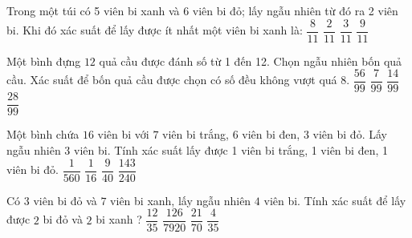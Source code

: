 \begin{ex}
Trong một túi có 5 viên bi xanh và 6 viên bi đỏ; lấy ngẫu nhiên từ đó ra 2 viên bi. Khi đó xác suất để lấy được ít nhất một viên bi xanh là:
\choice
{$\dfrac{8}{11}$}
{$\dfrac{2}{11}$}
{\True $\dfrac{3}{11}$}
{$\dfrac{9}{11}$}
\end{ex}
\begin{ex}
Một bình đựng $12$ quả cầu được đánh số từ 1 đến 12. Chọn ngẫu nhiên bốn quả cầu. Xác suất để bốn quả cầu được chọn có số đều không vượt quá 8.
\choice
{$\dfrac{56}{99}$}
{$\dfrac{7}{99}$}
{\True $\dfrac{14}{99}$}
{$\dfrac{28}{99}$}
\end{ex}
\begin{ex}
Một bình chứa $16$ viên bi với $7$ viên bi trắng, $6$ viên bi đen, 3 viên bi đỏ. Lấy ngẫu nhiên 3 viên bi. Tính xác suất lấy được 1 viên bi trắng, 1 viên bi đen, 1 viên bi đỏ.
\choice
{$\dfrac{1}{560}$}
{$\dfrac{1}{16}$}
{\True $\dfrac{9}{40}$}
{$\dfrac{143}{240}$}
\end{ex}
\begin{ex}
Có $3$ viên bi đỏ và $7$ viên bi xanh, lấy ngẫu nhiên $4$ viên bi. Tính xác suất để lấy được $2$ bi đỏ và $2$ bi xanh ?
\choice
{$\dfrac{12}{35}$}
{$\dfrac{126}{7920}$}
{\True $\dfrac{21}{70}$}
{$\dfrac{4}{35}$}
\end{ex}
